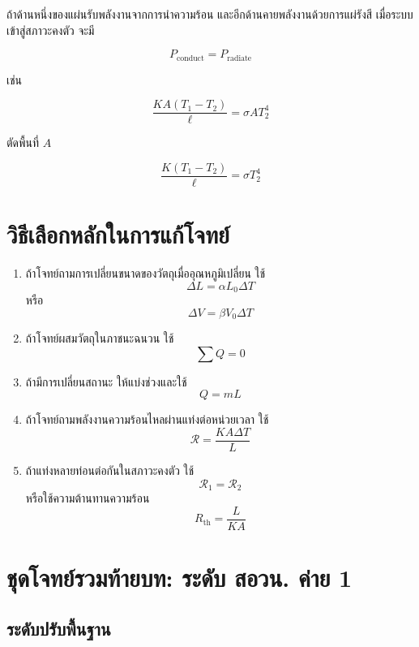 ถ้าด้านหนึ่งของแผ่นรับพลังงานจากการนำความร้อน และอีกด้านคายพลังงานด้วยการแผ่รังสี เมื่อระบบเข้าสู่สภาวะคงตัว จะมี

\[
P_{\text{conduct}}=P_{\text{radiate}}
\]

เช่น

\[
\frac{KA(T_1-T_2)}{\ell}
=
\sigma AT_2^4
\]

ตัดพื้นที่ $A$

\[
\frac{K(T_1-T_2)}{\ell}
=
\sigma T_2^4
\]

\section{วิธีเลือกหลักในการแก้โจทย์}

\begin{tcolorbox}[title=แผนการเลือกสมการ]
\begin{enumerate}
    \item ถ้าโจทย์ถามการเปลี่ยนขนาดของวัตถุเมื่ออุณหภูมิเปลี่ยน ใช้
    \[
    \Delta L=\alpha L_0\Delta T
    \]
    หรือ
    \[
    \Delta V=\beta V_0\Delta T
    \]

    \item ถ้าโจทย์ผสมวัตถุในภาชนะฉนวน ใช้
    \[
    \sum Q=0
    \]

    \item ถ้ามีการเปลี่ยนสถานะ ให้แบ่งช่วงและใช้
    \[
    Q=mL
    \]

    \item ถ้าโจทย์ถามพลังงานความร้อนไหลผ่านแท่งต่อหน่วยเวลา ใช้
    \[
    \mathcal{R}=\frac{KA\Delta T}{L}
    \]

    \item ถ้าแท่งหลายท่อนต่อกันในสภาวะคงตัว ใช้
    \[
    \mathcal{R}_1=\mathcal{R}_2
    \]
    หรือใช้ความต้านทานความร้อน
    \[
    R_{\text{th}}=\frac{L}{KA}
    \]
\end{enumerate}
\end{tcolorbox}

\section{ชุดโจทย์รวมท้ายบท: ระดับ สอวน. ค่าย 1}

\subsection*{ระดับปรับพื้นฐาน}

